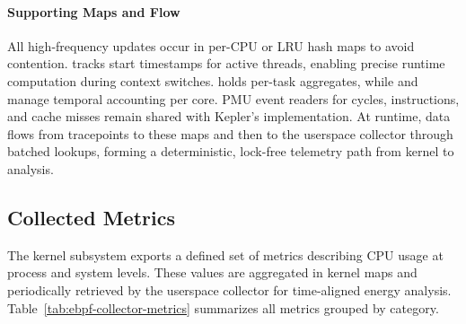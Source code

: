 \paragraph{Supporting Maps and Flow}
All high-frequency updates occur in per-CPU or LRU hash maps to avoid contention.  
 tracks start timestamps for active threads, enabling precise runtime computation during context switches.  
 holds per-task aggregates, while  and  manage temporal accounting per core.  
PMU event readers for cycles, instructions, and cache misses remain shared with Kepler’s implementation.  
At runtime, data flows from tracepoints to these maps and then to the userspace collector through batched lookups, forming a deterministic, lock-free telemetry path from kernel to analysis.

\subsection{Collected Metrics}
\label{subsec:ebpf-collector-metrics}

The kernel  subsystem exports a defined set of metrics describing CPU usage at process and system levels.  
These values are aggregated in kernel maps and periodically retrieved by the userspace collector for time-aligned energy analysis.  
Table~\ref{tab:ebpf-collector-metrics} summarizes all metrics grouped by category.

